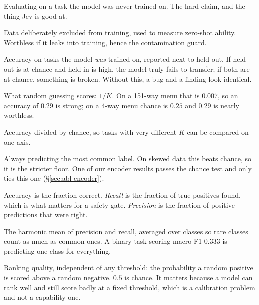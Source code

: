 \begin{description}[leftmargin=0em,style=nextline,itemsep=0.3em]

\item[Zero-shot] Evaluating on a task the model was never trained on. The
hard claim, and the thing Jev is good at.

\item[Held-out] Data deliberately excluded from training, used to measure
zero-shot ability. Worthless if it leaks into training, hence the
contamination guard.

\item[Held-in control] Accuracy on tasks the model \emph{was} trained on,
reported next to held-out. If held-out is at chance and held-in is high,
the model truly fails to transfer; if both are at chance, something is
broken. Without this, a bug and a finding look identical.

\item[Chance] What random guessing scores: $1/K$. On a 151-way menu that
is $0.007$, so an accuracy of $0.29$ is strong; on a 4-way menu chance is
$0.25$ and $0.29$ is nearly worthless.

\item[Multiple of chance] Accuracy divided by chance, so tasks with very
different $K$ can be compared on one axis.

\item[Majority-class baseline] Always predicting the most common label.
On skewed data this beats chance, so it is the stricter floor. One of our
encoder results passes the chance test and only ties this one
(\S\ref{sec:abl-encoder}).

\item[Accuracy, precision, recall] Accuracy is the fraction correct.
\emph{Recall} is the fraction of true positives found, which is what
matters for a safety gate. \emph{Precision} is the fraction of positive
predictions that were right.

\item[Macro-F1] The harmonic mean of precision and recall, averaged over
classes so rare classes count as much as common ones. A binary task
scoring macro-F1 $0.333$ is predicting one class for everything.

\item[AUROC] Ranking quality, independent of any threshold: the
probability a random positive is scored above a random negative. $0.5$ is
chance. It matters because a model can rank well and still score badly at
a fixed threshold, which is a calibration problem and not a capability
one.


\end{description}
